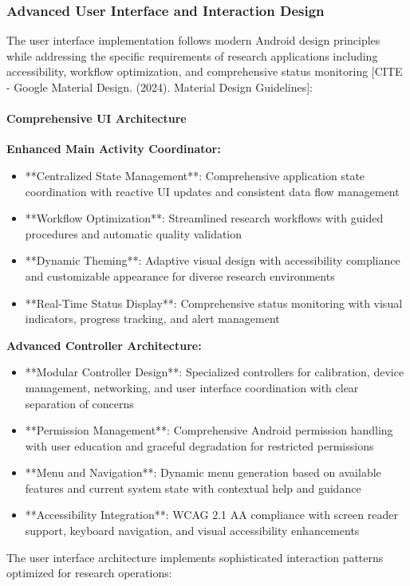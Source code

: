 \documentclass[11pt,a4paper]{report}
\begin{document}
\subsubsection{Advanced User Interface and Interaction Design}

The user interface implementation follows modern Android design principles while addressing the specific requirements of
research applications including accessibility, workflow optimization, and comprehensive status
monitoring [CITE - Google Material Design. (2024). Material Design Guidelines]:

\paragraph{Comprehensive UI Architecture}

\textbf{Enhanced Main Activity Coordinator:}

\begin{itemize}
\item **Centralized State Management**: Comprehensive application state coordination with reactive UI updates and consistent
  data flow management
\item **Workflow Optimization**: Streamlined research workflows with guided procedures and automatic quality validation
\item **Dynamic Theming**: Adaptive visual design with accessibility compliance and customizable appearance for diverse
  research environments
\item **Real-Time Status Display**: Comprehensive status monitoring with visual indicators, progress tracking, and alert
  management

\end{itemize}
\textbf{Advanced Controller Architecture:}

\begin{itemize}
\item **Modular Controller Design**: Specialized controllers for calibration, device management, networking, and user
  interface coordination with clear separation of concerns
\item **Permission Management**: Comprehensive Android permission handling with user education and graceful degradation for
  restricted permissions
\item **Menu and Navigation**: Dynamic menu generation based on available features and current system state with contextual
  help and guidance
\item **Accessibility Integration**: WCAG 2.1 AA compliance with screen reader support, keyboard navigation, and visual
  accessibility enhancements

\end{itemize}
The user interface architecture implements sophisticated interaction patterns optimized for research operations:
\end{document}
